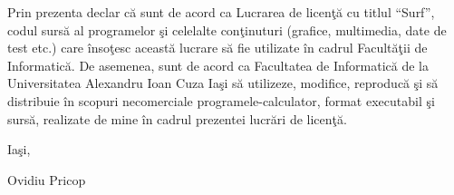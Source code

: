Prin prezenta declar c\u{a} sunt de acord ca Lucrarea de licen\c{t}\u{a} cu titlul \enquote{Surf}, codul surs\u{a} al programelor \c{s}i celelalte con\c{t}inuturi (grafice, multimedia, date de test etc.) care \^{i}nso\c{t}esc aceast\u{a} lucrare s\u{a} fie utilizate \^{i}n cadrul Facult\u{a}\c{t}ii de Informatic\u{a}.
De asemenea, sunt de acord ca Facultatea de Informatic\u{a} de la Universitatea Alexandru Ioan Cuza Ia\c{s}i s\u{a} utilizeze, modifice, reproduc\u{a} \c{s}i s\u{a} distribuie \^{i}n scopuri necomerciale programele-calculator, format executabil \c{s}i surs\u{a}, realizate de mine \^{i}n cadrul prezentei lucr\u{a}ri de licen\c{t}\u{a}.

\begin{bottompar}
	\begin{flushleft}
		Ia\c{s}i, \GLOBALDATE
	\end{flushleft}

	\vspace{0.5cm}
	\begin{flushright}
		Ovidiu Pricop
	\end{flushright}
\end{bottompar}